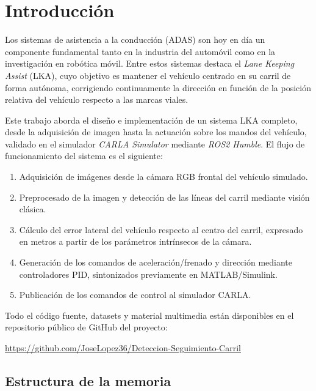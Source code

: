 \documentclass[12pt, a4paper]{article}
\begin{document}
\section{Introducción}

Los sistemas de asistencia a la conducción (ADAS) son hoy en día un componente fundamental tanto en la industria del automóvil como en la investigación en robótica móvil. Entre estos sistemas destaca el \textit{Lane Keeping Assist} (LKA), cuyo objetivo es mantener el vehículo centrado en su carril de forma autónoma, corrigiendo continuamente la dirección en función de la posición relativa del vehículo respecto a las marcas viales.

Este trabajo aborda el diseño e implementación de un sistema LKA completo, desde la adquisición de imagen hasta la actuación sobre los mandos del vehículo, validado en el simulador \textit{CARLA Simulator} mediante \textit{ROS2 Humble}. El flujo de funcionamiento del sistema es el siguiente:

\begin{enumerate}
    \item Adquisición de imágenes desde la cámara RGB frontal del vehículo simulado.
    \item Preprocesado de la imagen y detección de las líneas del carril mediante visión clásica.
    \item Cálculo del error lateral del vehículo respecto al centro del carril, expresado en metros a partir de los parámetros intrínsecos de la cámara.
    \item Generación de los comandos de aceleración/frenado y dirección mediante controladores PID, sintonizados previamente en MATLAB/Simulink.
    \item Publicación de los comandos de control al simulador CARLA.
\end{enumerate}

Todo el código fuente, datasets y material multimedia están disponibles en el repositorio público de GitHub del proyecto:
\begin{center}
    \url{https://github.com/JoseLopez36/Deteccion-Seguimiento-Carril}
\end{center}

\subsection*{Estructura de la memoria}
\end{document}
